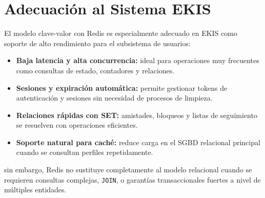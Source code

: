 \section{Adecuación al Sistema EKIS}

El modelo clave-valor con Redis es especialmente adecuado en EKIS como soporte de alto rendimiento para el subsistema de usuarios:

\begin{itemize}
    \item \textbf{Baja latencia y alta concurrencia:} ideal para operaciones muy frecuentes como consultas de estado, contadores y relaciones.
    \item \textbf{Sesiones y expiración automática:} permite gestionar tokens de autenticación y sesiones sin necesidad de procesos de limpieza.
    \item \textbf{Relaciones rápidas con SET:} amistades, bloqueos y listas de seguimiento se resuelven con operaciones eficientes.
    \item \textbf{Soporte natural para caché:} reduce carga en el SGBD relacional principal cuando se consultan perfiles repetidamente.
\end{itemize}
sin embargo, Redis no sustituye completamente al modelo relacional cuando se requieren consultas complejas, \texttt{JOIN}, o garantías transaccionales fuertes a nivel de múltiples entidades.

